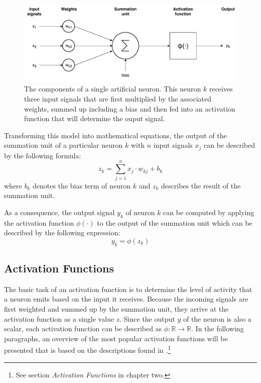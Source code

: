 \begin{figure}[h]
  \centering
  \includegraphics[width=\textwidth]{../figures/single_neuron}
  \caption{The components of a single artificial neuron. This neuron
    \(k\) receives three input signals that are first multiplied by
    the associated weights, summed up including a bias and then fed
    into an activation function that will determine the ouput signal.}
  \label{fig:single-neuron}
\end{figure}
Transforming this model into mathematical equations, the output of the
summation unit of a particular
neuron \(k\) with \(n\) input signals \(x_j\) can be described by the
following formula:
\begin{equation}
  z_k = \sum_{j=1}^{n}{x_j \cdot w_{kj}} + b_k
\end{equation}
where \(b_k\) denotes the bias term of neuron \(k\) and \(z_k\) describes the
result of the summation unit.

As a consequence, the output signal \(y_k\) of neuron \(k\) can be computed by
applying the activation function \(\phi(\cdot)\) to the output of the
summation unit which can be described by the following expression:
\begin{equation}
  y_k = \phi(z_k)
\end{equation}

\subsection{Activation Functions}
\label{sec:activation-functions}
The basic task of an activation function is to determine the level of
activity that a neuron emits based on the input it receives. Because the
incoming signals are first weighted and summed up by the summation unit, they
arrive at the activation function as a single value \(z\). Since the
output \(y\)
of the neuron is also a scalar, each activation function can be
described as \(\phi: \mathbb{R} \rightarrow \mathbb{R}\). In the
following paragraphs, an overview of the most popular activation
functions will be presented that is based on the descriptions found in
\cite{Patterson}.\footnote{See section \textit{Activation Functions}
  in chapter two.}

